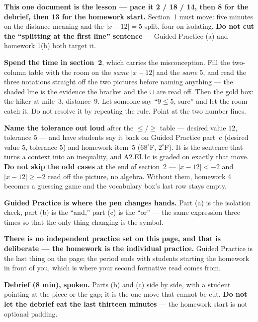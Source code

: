 \documentclass[10pt]{article}
\begin{document}
\begin{teachernote}
\textbf{This one document is the lesson --- pace it 2 / 18 / 14, then 8 for the debrief, then 13
for the homework start.} Section~1 must move: five minutes on the distance meaning and the
$|x-12|=5$ split, four on isolating. \textbf{Do not cut the ``splitting at the first line''
sentence} --- Guided Practice (a) and homework 1(b) both target it.

\textbf{Spend the time in section~2}, which carries the misconception. Fill the two-column table
with the room on the \emph{same} $|x-12|$ and the \emph{same} $5$, and read the three notations
straight off the two pictures before naming anything --- the shaded line is the evidence the
bracket and the $\cup$ are read off. Then the gold box: the hiker at mile~3, distance~9. Let
someone say ``$9\le5$, sure'' and let the room catch it. Do not resolve it by repeating the rule.
Point at the two number lines.

\textbf{Name the tolerance out loud} after the $\le$/$\ge$ table --- desired value $12$,
tolerance $5$ --- and have students say it back on Guided Practice part~c (desired value $5$,
tolerance $5$) and homework item~5 ($68^\circ$F, $2^\circ$F). It is the sentence that turns a
context into an inequality, and A2.EI.1c is graded on exactly that move.
\textbf{Do not skip the odd cases} at the end of section~2 --- $|x-12|<-2$ and $|x-12|\ge-2$
read off the picture, no algebra. Without them, homework 4 becomes a guessing game and the
vocabulary box's last row stays empty.

\textbf{Guided Practice is where the pen changes hands.} Part (a) is the isolation check, part
(b) is the ``and,'' part (c) is the ``or'' --- the same expression three times so that the only
thing changing is the symbol.

\textbf{There is no independent practice set on this page, and that is deliberate --- the
homework is the individual practice.} Guided Practice is the last thing on the page; the period
ends with students starting the homework in front of you, which is where your second formative
read comes from.

\textbf{Debrief (8 min), spoken.} Parts (b) and (c) side by side, with a student pointing at the
piece or the gap; it is the one move that cannot be cut. \textbf{Do not let the debrief eat the
last thirteen minutes} --- the homework start is not optional padding.
\end{teachernote}
\end{document}
